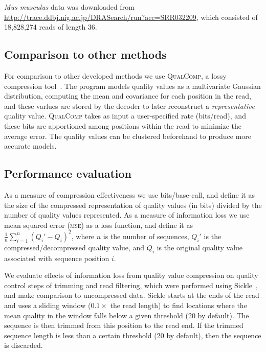 \documentclass{bioinfo}
\begin{document}
\begin{methods}
\textit{Mus musculus} data was downloaded from
\url{http://trace.ddbj.nig.ac.jp/DRASearch/run?acc=SRR032209}, which
consisted of 18,828,274 reads of length 36.

\subsection{Comparison to other methods}

For comparison to other developed methods we use \textsc{QualComp}, a
lossy compression tool~\citep{Ochoa:2013rt}. The program models
quality values as a multivariate Gaussian distribution, computing the
mean and covariance for each position in the read, and these varlues
are stored by the decoder to later reconstruct a \emph{representative}
quality value. \textsc{QualComp} takes as input a user-specified rate
(bits/read), and these bits are apportioned among positions within the
read to minimize the average error. The quality values can be
clustered beforehand to produce more accurate models.

\subsection{Performance evaluation}

As a measure of compression effectiveness we use bits/base-call, and
define it as the size of the compressed representation of quality
values (in bits) divided by the number of quality values represented.
As a measure of information loss we use mean squared error
(\textsc{mse}) as a loss function, and define it as
$\frac{1}{n}\sum_{i=1}^{n}{(Q_i'-Q_i)^2}$, where $n$ is the number of
sequences, $Q_i'$ is the compressed/decompressed quality value, and
$Q_i$ is the original quality value associated with sequence position
$i$.

We evaluate effects of information loss from quality value compression
on quality control steps of trimming and read filtering, which were
performed using Sickle~\citep{sickle}, and make comparison to
uncompressed data. Sickle starts at the ends of the read and uses a
sliding window ($0.1 \times$ the read length) to find locations where
the mean quality in the window falls below a given threshold (20 by
default). The sequence is then trimmed from this position to the read
end. If the trimmed sequence length is less than a certain threshold
(20 by default), then the sequence is discarded.


\end{methods}
\end{document}
